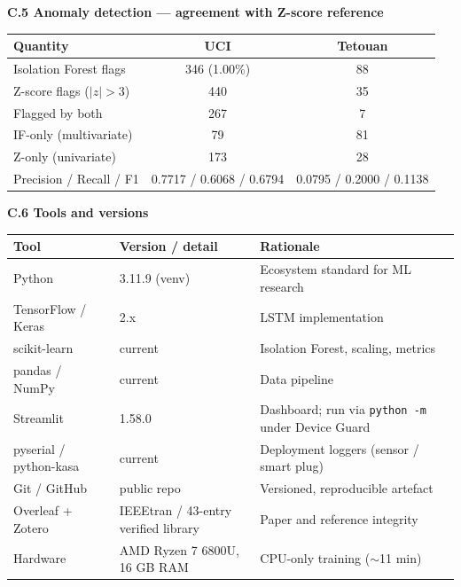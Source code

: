 \documentclass[11pt,a4paper]{article}
\begin{document}
\noindent\textbf{C.5 Anomaly detection --- agreement with Z-score reference}\par\smallskip
\begin{tabular}{|l|c|c|}
\hline
\textbf{Quantity} & \textbf{UCI} & \textbf{Tetouan}\\ \hline
Isolation Forest flags & 346 (1.00\%) & 88\\ \hline
Z-score flags ($|z|>3$) & 440 & 35\\ \hline
Flagged by both & 267 & 7\\ \hline
IF-only (multivariate) & 79 & 81\\ \hline
Z-only (univariate) & 173 & 28\\ \hline
Precision / Recall / F1 & 0.7717 / 0.6068 / 0.6794 & 0.0795 / 0.2000 / 0.1138\\ \hline
\end{tabular}
\bigskip

\noindent\textbf{C.6 Tools and versions}\par\smallskip
\begin{tabular}{|l|l|p{5.6cm}|}
\hline
\textbf{Tool} & \textbf{Version / detail} & \textbf{Rationale}\\ \hline
Python & 3.11.9 (venv) & Ecosystem standard for ML research\\ \hline
TensorFlow / Keras & 2.x & LSTM implementation \cite{abadi2016tensorflow}\\ \hline
scikit-learn & current & Isolation Forest, scaling, metrics\\ \hline
pandas / NumPy & current & Data pipeline\\ \hline
Streamlit & 1.58.0 & Dashboard; run via \texttt{python -m} under Device Guard\\ \hline
pyserial / python-kasa & current & Deployment loggers (sensor / smart plug)\\ \hline
Git / GitHub & public repo & Versioned, reproducible artefact\\ \hline
Overleaf + Zotero & IEEEtran / 43-entry verified library & Paper and reference integrity\\ \hline
Hardware & AMD Ryzen 7 6800U, 16 GB RAM & CPU-only training ($\sim$11 min)\\ \hline
\end{tabular}
\bigskip
\end{document}
